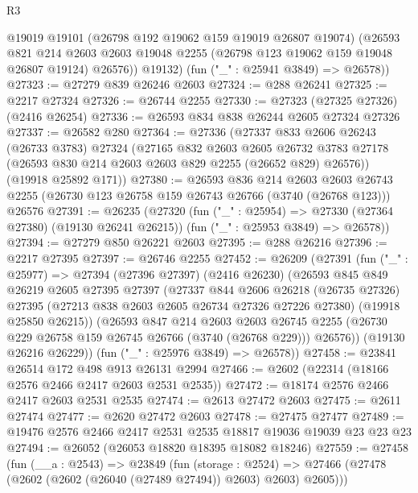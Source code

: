 \begin{lexlean}{R3}
\begin{coremodule}
          @19019
          @19101
          (@26798 @192 @19062 @159 @19019 @26807 @19074)
          (@26593
            @821
            @214
            @2603
            @2603
            @19048
            @2255
            (@26798 @123 @19062 @159 @19048 @26807 @19124)
            @26576))
        @19132)
      (fun ("_" : @25941 @3849) => @26578))
@27323 := @27279 @839 @26246 @2603
@27324 := @288 @26241
@27325 := @2217 @27324
@27326 := @26744 @2255
@27330 := @27323 (@27325 @27326) (@2416 @26254)
@27336 := @26593 @834 @838 @26244 @2605 @27324 @27326
@27337 := @26582 @280
@27364 := @27336
    (@27337
      @833
      @2606
      @26243
      (@26733 @3783)
      @27324
      (@27165
        @832
        @2603
        @2605
        @26732
        @3783
        @27178
        (@26593 @830 @214 @2603 @2603 @829 @2255 (@26652 @829) @26576))
      (@19918 @25892 @171))
@27380 := @26593
    @836
    @214
    @2603
    @2603
    @26743
    @2255
    (@26730 @123 @26758 @159 @26743 @26766 (@3740 (@26768 @123)))
    @26576
@27391 := @26235
    (@27320
      (fun ("_" : @25954) => @27330 (@27364 @27380) (@19130 @26241 @26215))
      (fun ("_" : @25953 @3849) => @26578))
@27394 := @27279 @850 @26221 @2603
@27395 := @288 @26216
@27396 := @2217 @27395
@27397 := @26746 @2255
@27452 := @26209
    (@27391
      (fun ("_" : @25977) =>
      @27394
        (@27396 @27397)
        (@2416 @26230)
        (@26593
          @845
          @849
          @26219
          @2605
          @27395
          @27397
          (@27337
            @844
            @2606
            @26218
            (@26735 @27326)
            @27395
            (@27213 @838 @2603 @2605 @26734 @27326 @27226 @27380)
            (@19918 @25850 @26215))
          (@26593
            @847
            @214
            @2603
            @2603
            @26745
            @2255
            (@26730 @229 @26758 @159 @26745 @26766 (@3740 (@26768 @229)))
            @26576))
        (@19130 @26216 @26229))
      (fun ("_" : @25976 @3849) => @26578))
@27458 := @23841 @26514 @172 @498 @913 @26131 @2994
@27466 := @2602 (@22314 (@18166 @2576 @2466 @2417 @2603 @2531 @2535))
@27472 := @18174 @2576 @2466 @2417 @2603 @2531 @2535
@27474 := @2613 @27472 @2603
@27475 := @2611 @27474
@27477 := @2620 @27472 @2603
@27478 := @27475 @27477
@27489 := @19476 @2576 @2466 @2417 @2531 @2535 @18817 @19036 @19039 @23 @23 @23
@27494 := @26052 (@26053 @18820 @18395 @18082 @18246)
@27559 := @27458
    (fun (__a : @2543) =>
    @23849
      (fun (storage : @2524) =>
      @27466 (@27478 (@2602 (@2602 (@26040 (@27489 @27494)) @2603) @2603) @2605)))

\end{coremodule}
\end{lexlean}
